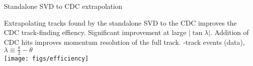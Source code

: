\begin{frame}{Standalone SVD to CDC extrapolation}
\bi
\item Extrapolating tracks found by the standalone SVD to the CDC improves the CDC track-finding effiency.
\bi
\itemii Significant improvement at large $|\tan\lambda|$.
\ei
\itemii Addition of CDC hits improves momentum resolution of the full track. 
\ei
\vspace{0.25cm}
-track events (data), $\lambda\equiv\frac{\pi}{2}-\theta$\\
\texttt{[image: figs/efficiency]} 
\end{frame}
